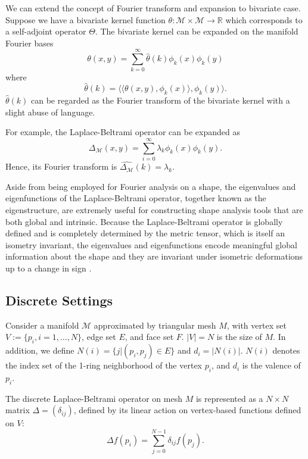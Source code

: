 We can extend the concept of Fourier transform and expansion to bivariate case. Suppose we have
a bivariate kernel function $\theta:\mathcal{M}\times\mathcal{M}\to\mathbb{R}$ which corresponds
to a self-adjoint operator $\Theta$. The bivariate kernel can be expanded on the manifold Fourier bases
\begin{equation}
\theta(x,y)=\sum_{k=0}^\infty \hat{\theta}(k)\phi_k(x)\phi_k(y)
\end{equation}
where
\begin{equation}
\hat{\theta}(k)=\langle\langle\theta(x,y),\phi_k(x)\rangle,\phi_k(y)\rangle.
\end{equation}
$\hat{\theta}(k)$ can be regarded as the Fourier transform of the bivariate kernel with a slight abuse of language.

For example, the Laplace-Beltrami operator can be expanded as
\begin{equation}
\Delta_\mathcal{M}(x,y)=\sum_{i=0}^\infty \lambda_k\phi_k(x)\phi_k(y).
\end{equation}
Hence, its Fourier transform is $\widehat{\Delta_\mathcal{M}}(k)=\lambda_k$.

Aside from being employed for Fourier analysis on a shape, the eigenvalues and eigenfunctions of the
Laplace-Beltrami operator, together known as the eigenstructure, are extremely useful for
constructing shape analysis tools that are both global and intrinsic. Because the Laplace-Beltrami
operator is globally defined and is completely determined by the metric tensor, which is itself an
isometry invariant, the eigenvalues and eigenfunctions encode meaningful global information about
the shape and they are invariant under isometric deformations up to a change in
sign \cite{Rustamov:2007:LEF,Sun:2009:CGF}.

\subsection*{Discrete Settings}
Consider a manifold $\mathcal{M}$ approximated by triangular mesh $M$, with vertex
set $V:=\{p_i, i=1,\ldots,N\}$, edge set $E$, and face set $F$. $|V|=N$ is the size
of $M$. In addition, we define $N(i)=\{j|(p_i,p_j)\in E\}$ and $d_i=|N(i)|$. $N(i)$
denotes the index set of the 1-ring neighborhood of the vertex $p_i$, and $d_i$ is
the valence of $p_i$.

The discrete Laplace-Beltrami operator on mesh $M$ is represented as a
$N\times N$ matrix $\Delta=(\delta_{ij})$, defined by its linear action
on vertex-based functions defined on $V$:
\begin{equation}
\Delta f(p_i)=\sum_{j=0}^{N-1}\delta_{ij}f(p_j).
\end{equation}

